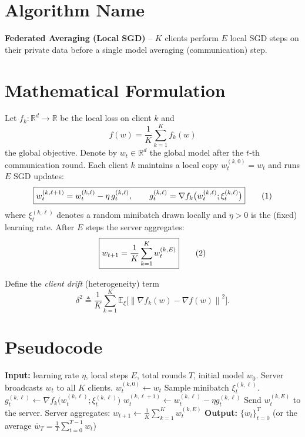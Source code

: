 \documentclass{article}
\newcommand{\E}{\mathbb{E}}
\newcommand{\norm}[1]{\left\lVert #1\right\rVert}
\begin{document}
\section*{Algorithm Name}
\textbf{Federated Averaging (Local SGD)} – $K$ clients perform $E$ local SGD steps on their private data before a single model averaging (communication) step.

\section*{Mathematical Formulation}
Let $f_k:\mathbb{R}^d\rightarrow\mathbb{R}$ be the local loss on client $k$ and 
\[
f(w)=\frac1K\sum_{k=1}^{K}f_k(w)
\]
the global objective.  
Denote by $w_t\in\mathbb{R}^d$ the global model after the $t$‑th communication round.  
Each client $k$ maintains a local copy $w_{t}^{(k,0)}=w_t$ and runs $E$ SGD updates:
\[
\boxed{%
w_{t}^{(k,\ell+1)} = w_{t}^{(k,\ell)} - \eta \, g_{t}^{(k,\ell)},\qquad 
g_{t}^{(k,\ell)} = \nabla f_k\bigl(w_{t}^{(k,\ell)}; \xi_{t}^{(k,\ell)}\bigr)
}
\tag{1}
\]
where $\xi_{t}^{(k,\ell)}$ denotes a random minibatch drawn locally and $\eta>0$ is the (fixed) learning rate.  
After $E$ steps the server aggregates:
\[
\boxed{%
w_{t+1}= \frac1K\sum_{k=1}^{K} w_{t}^{(k,E)}
}
\tag{2}
\]

Define the \emph{client drift} (heterogeneity) term
\[
\delta^2 \triangleq \frac1K\sum_{k=1}^{K}\E_{\xi}\!\bigl[\norm{\nabla f_k(w)-\nabla f(w)}^2\bigr].
\tag{3}
\]

\section*{Pseudocode}
\begin{algorithm}[H]
\caption{Federated Averaging (Local SGD)}
\begin{algorithmic}[1]
\STATE \textbf{Input:} learning rate $\eta$, local steps $E$, total rounds $T$, initial model $w_0$.
    \STATE Server broadcasts $w_t$ to all $K$ clients.
        \STATE $w_{t}^{(k,0)}\gets w_t$
            \STATE Sample minibatch $\xi_{t}^{(k,\ell)}$.
            \STATE $g_{t}^{(k,\ell)}\gets \nabla f_k\!\bigl(w_{t}^{(k,\ell)};\xi_{t}^{(k,\ell)}\bigr)$
            \STATE $w_{t}^{(k,\ell+1)}\gets w_{t}^{(k,\ell)}-\eta g_{t}^{(k,\ell)}$
        \ENDFOR
        \STATE Send $w_{t}^{(k,E)}$ to the server.
    \ENDFOR
    \STATE Server aggregates: $w_{t+1}\gets \frac1K\sum_{k=1}^{K} w_{t}^{(k,E)}$
\ENDFOR
\STATE \textbf{Output:} $\{w_t\}_{t=0}^{T}$ (or the average $\bar w_T=\frac1T\sum_{t=0}^{T-1} w_t$)
\end{algorithmic}
\end{algorithm}
\end{document}
